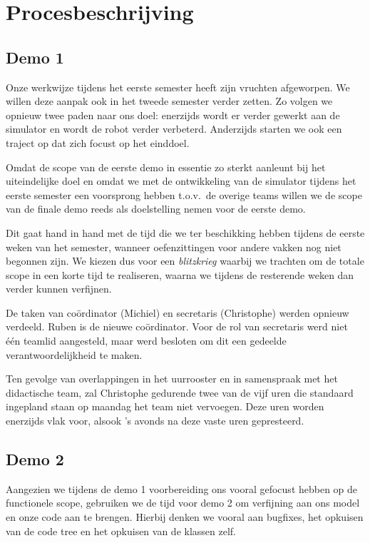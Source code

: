 \documentclass[12pt,a4paper]{report}
\begin{document}
\chapter{Procesbeschrijving}
\label{ch:process}

\section{Demo 1}

Onze werkwijze tijdens het eerste semester heeft zijn vruchten afgeworpen. We willen deze aanpak ook in het tweede semester verder zetten. Zo volgen we opnieuw twee paden naar ons doel: enerzijds wordt er verder gewerkt aan de simulator en wordt de robot verder verbeterd. Anderzijds starten we ook een traject op dat zich focust op het einddoel.

Omdat de scope van de eerste demo in essentie zo sterkt aanleunt bij het uiteindelijke doel en omdat we met de ontwikkeling van de simulator tijdens het eerste semester een voorsprong hebben t.o.v.\ de overige teams willen we de scope van de finale demo reeds als doelstelling nemen voor de eerste demo.

Dit gaat hand in hand met de tijd die we ter beschikking hebben tijdens de eerste weken van het semester, wanneer oefenzittingen voor andere vakken nog niet begonnen zijn. We kiezen dus voor een \emph{blitzkrieg} waarbij we trachten om de totale scope in een korte tijd te realiseren, waarna we tijdens de resterende weken dan verder kunnen verfijnen.

De taken van co\"ordinator (Michiel) en secretaris (Christophe) werden opnieuw verdeeld. Ruben is de nieuwe co\"ordinator. Voor de rol van secretaris werd niet \'e\'en teamlid aangesteld, maar werd besloten om dit een gedeelde verantwoordelijkheid te maken.

Ten gevolge van overlappingen in het uurrooster en in samenspraak met het didactische team, zal Christophe gedurende twee van de vijf uren die standaard ingepland staan op maandag het team niet vervoegen. Deze uren worden enerzijds vlak voor, alsook 's avonds na deze vaste uren gepresteerd.

\section{Demo 2}

Aangezien we tijdens de demo 1 voorbereiding ons vooral gefocust hebben op de functionele scope, gebruiken we de tijd voor demo 2 om verfijning aan ons model en onze code aan te brengen. Hierbij denken we vooral aan bugfixes, het opkuisen van de code tree en het opkuisen van de klassen zelf.
\end{document}
